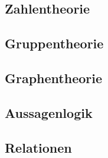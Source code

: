 \documentclass[10pt,a4paper]{article}
\begin{document}
\subsection{Zahlentheorie}



\subsection{Gruppentheorie}



\subsection{Graphentheorie}




\subsection{Aussagenlogik}



\subsection{Relationen}
\end{document}
